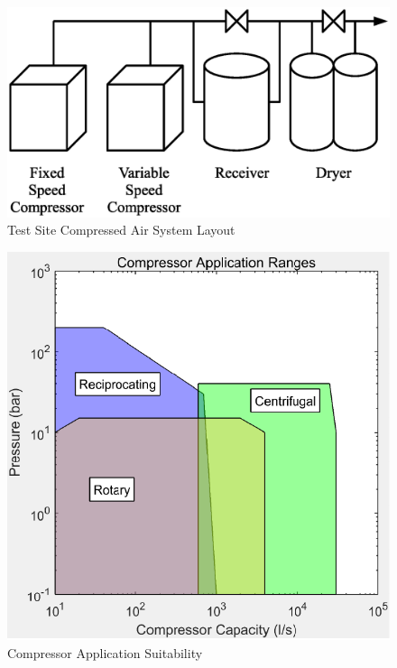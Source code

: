 \begin{figure}
\includegraphics[width = \columnwidth]{./Images/PharmacyCompAir.eps}
\caption{Test Site Compressed Air System Layout}
\label{fig:compairlayout}
\end{figure}

\begin{figure}
\includegraphics[width = \columnwidth]{./Images/CompApps.pdf}
\caption{Compressor Application Suitability}
\label{fig:CompApps}
\end{figure}

